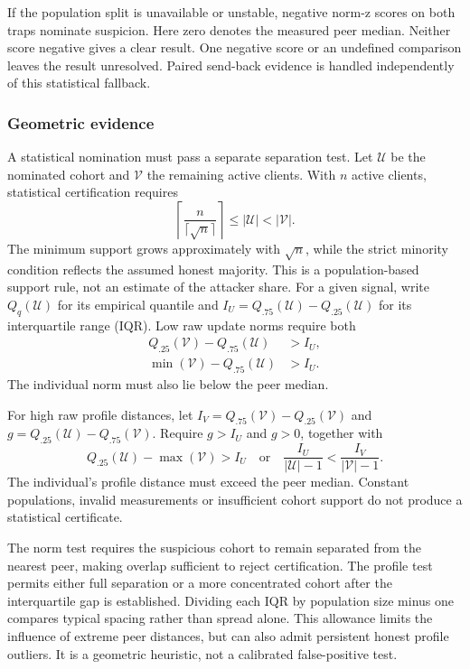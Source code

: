 \documentclass[conference]{IEEEtran}
\begin{document}
If the population split is unavailable or unstable, negative norm-z scores
on both traps nominate suspicion. Here zero denotes the measured peer
median. Neither score negative gives a clear result. One negative score
or an undefined comparison leaves the result unresolved. Paired send-back evidence is handled
independently of this statistical fallback.

\subsubsection{Geometric evidence}
A statistical nomination must pass a separate separation test. Let
$\mathcal U$ be the nominated cohort and $\mathcal V$ the remaining active
clients. With $n$ active clients, statistical certification requires
\begin{equation}\label{eq:cohort-support}
 \left\lceil\frac{n}{\lceil\sqrt n\rceil}\right\rceil
       \leq|\mathcal U|<|\mathcal V|.
\end{equation}
The minimum support grows approximately with $\sqrt n$, while the strict
minority condition reflects the assumed honest majority. This is a
population-based support rule, not an estimate of the attacker share.
For a given signal, write $Q_q(\mathcal U)$ for its empirical quantile
and $I_U=Q_{.75}(\mathcal U)-Q_{.25}(\mathcal U)$ for its interquartile
range (IQR). Low raw update norms require both
\begin{align}\label{eq:norm-certificate}
 Q_{.25}(\mathcal V)-Q_{.75}(\mathcal U)&>I_U,\\
 \min(\mathcal V)-Q_{.75}(\mathcal U)&>I_U.\nonumber
\end{align}
The individual norm must also lie below the peer median.

For high raw profile distances, let
$I_V=Q_{.75}(\mathcal V)-Q_{.25}(\mathcal V)$ and
$g=Q_{.25}(\mathcal U)-Q_{.75}(\mathcal V)$. Require $g>I_U$ and $g>0$,
together with
\begin{equation}\label{eq:profile-certificate}
 Q_{.25}(\mathcal U)-\max(\mathcal V)>I_U
 \quad\text{or}\quad
 \frac{I_U}{|\mathcal U|-1}<\frac{I_V}{|\mathcal V|-1}.
\end{equation}
The individual's profile distance must exceed the peer median. Constant
populations, invalid measurements or insufficient cohort support do not
produce a statistical certificate.

The norm test requires the suspicious cohort to remain separated from
the nearest peer, making overlap sufficient to reject certification.
The profile test permits either full separation or a more concentrated
cohort after the interquartile gap is established. Dividing each IQR by
population size minus one compares typical spacing rather than spread
alone. This allowance limits the influence of extreme peer distances,
but can also admit persistent honest profile outliers. It is a geometric
heuristic, not a calibrated false-positive test.
\end{document}
